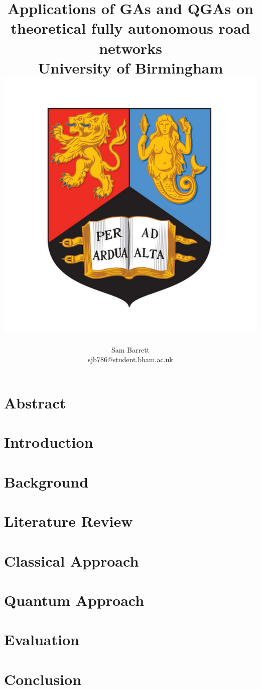 \documentclass[11pt]{report}
\title{
	{Applications of GAs and QGAs on theoretical fully autonomous road networks} \\
	{\large University of Birmingham} \\
	{\includegraphics[scale=0.3]{uobcrest.jpg}}
}
\author{Sam Barrett \\ sjb786@student.bham.ac.uk}
\begin{document}
\maketitle

\tableofcontents
\newpage

\chapter*{Abstract}

\chapter{Introduction}

\chapter{Background}

\chapter{Literature Review}

\chapter{Classical Approach}

\chapter{Quantum Approach}

\chapter{Evaluation}

\chapter{Conclusion}

\end{document}
